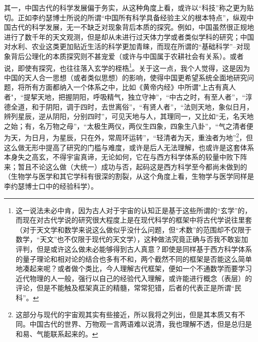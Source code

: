 \documentclass{article}
\begin{document}
其一，中国古代的科学发展偏于务实，从这种角度上看，或许以“科技”称之更为贴切。正如李约瑟博士所说的所谓“中国所有科学具备经验主义的根本特点”，纵观中国古代的科学发展，无一不缺乏对现象背后本质的探究。例如，中国虽然很正规地进行了数千年的天文观测，但是却从未进行过天体力学或者类似学科的研究；中国对水利、农业这类更加贴近生活的科学更加青睐，而现在所谓的“基础科学”--对现象背后公理化的本质探究则不甚宠爱（或许与中国属于农耕社会有关系）。或者说，即使有探究，也往往落入玄学的桎梏\footnote{这一说法未必中肯，因为古人对于宇宙的认知正是基于这些所谓的“玄学”的，而现在对古代学说的研究很大程度上是在现代科学的框架中将古代学说往里套（对于天文学和数学来说这么做似乎没什么问题，但“术数”的范围却不仅限于数学，“天文”也不仅限于现代的天文学），这种做法究竟正确与否我不敢妄加评判，但是或许这么做未必能够得到古人真意？即使是同样基于西方科学体系的量子理论和相对论的结合也多有不和，两个截然不同的框架是否能这么简单地凑起来呢？或者做个类比，今人理解古代框架，便如一个不通数学而要学习近代物理的人一般，强行以自己的经验代入理解，或许能进行概念（表层）的评论，但是不能触及框架真正的精髓，常常犯错，后者的代表正是所谓“民科”。}。关于这一点，我个人觉得，这是因为中国的天人合一思想（或者类似思想）的影响，使得中国更希望系统全面地研究问题，将所有方面都纳入一个体系之中，比如《黄帝内经》中所谓"上古有真人者"，“提挈天地，把握阴阳，呼吸精气，独立守神”，“中古之时，有至人者”，“淳德全道，和于阴阳，调于四时，去世离俗”，“有贤人者”，“法则天地，象似日月，辨列星辰，逆从阴阳，分别四时”，可见天地与人，其理同一，又比如“无，名天地之始；有，名万物之母”，“太极生两仪，两仪生四象，四象生八卦”，“气之清者便为天，为日月，为星辰，只在外，常周环运转”，“轻清者为天，重浊者为地”\footnote{这部分与现代的宇宙观其实有些接近，所以我将之列出，但是其本质又有不同。中国古代的世界、万物观一言两语难以说清，我也理解不透，但是总归是和易、气能联系起来的。}，但这么做无形中提高了研究的门槛与难度，或许是后人无法理解，也或许是这套体系本身失之高玄，不得宇宙真谛，无论如何，它在与西方科学体系的较量中败下阵来；暂且不论这么做（大统一）成功与否，起码这是西方科学至今都尚未做到的（生物学与医学和其它学科有很深的割裂，从这个角度上看，生物学与医学同样是李约瑟博士口中的经验科学）。
\end{document}
